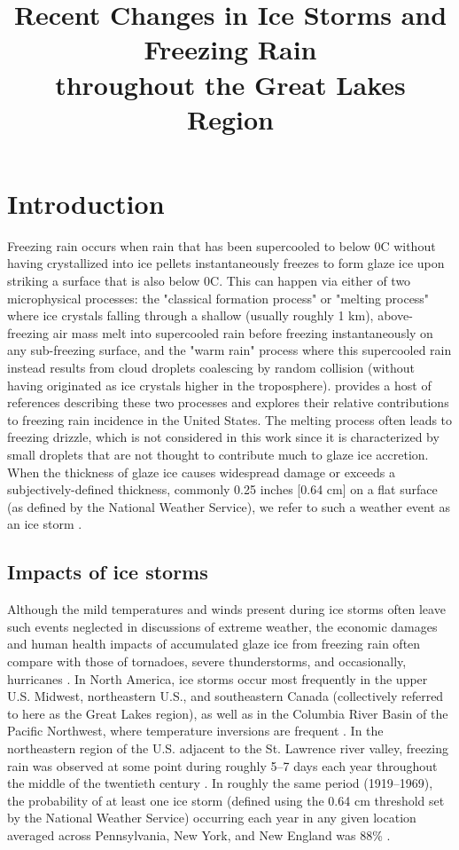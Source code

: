\documentclass[twocol]{ametsoc}
\title{Recent Changes in Ice Storms and Freezing Rain\\ throughout the Great Lakes Region}
\affiliation{ National Renewable Energy Laboratory, Golden, Colorado}
\begin{document}
\maketitle
%
\section{Introduction}
Freezing rain occurs when rain that has been supercooled to below 0\degree C without having crystallized into ice pellets instantaneously freezes to form glaze ice upon striking a surface that is also below 0\degree C. This can happen via either of two microphysical processes: the "classical formation process" or "melting process" where ice crystals falling through a shallow (usually roughly 1 km), above-freezing air mass melt into supercooled rain before freezing instantaneously on any sub-freezing surface, and the "warm rain" process where this supercooled rain instead results from cloud droplets coalescing by random collision (without having originated as ice crystals higher in the troposphere). \citet{rauber2000relative} provides a host of references describing these two processes and explores their relative contributions to freezing rain incidence in the United States. The melting process often leads to freezing drizzle, which is not considered in this work since it is characterized by small droplets that are not thought to contribute much to glaze ice accretion. When the thickness of glaze ice causes widespread damage or exceeds a subjectively-defined thickness, commonly 0.25 inches [0.64 cm] on a flat surface (as defined by the National Weather Service), we refer to such a weather event as an ice storm \citep{nwsglossary}.

\subsection{Impacts of ice storms}
Although the mild temperatures and winds present during ice storms often leave such events neglected in discussions of extreme weather, the economic damages and human health impacts of accumulated glaze ice from freezing rain often compare with those of tornadoes, severe thunderstorms, and occasionally, hurricanes \citep{lott2006tracking}. In North America, ice storms occur most frequently in the upper U.S. Midwest, northeastern U.S., and southeastern Canada (collectively referred to here as the Great Lakes region), as well as in the Columbia River Basin of the Pacific Northwest, where temperature inversions are frequent \citep{changnon2003temporal, bernstein2000regional}. In the northeastern region of the U.S. adjacent to the St. Lawrence river valley, freezing rain was observed at some point during roughly 5--7 days each year throughout the middle of the twentieth century \citep{changnon2003temporal}. In roughly the same period (1919--1969), the probability of at least one ice storm (defined using the 0.64 cm threshold set by the National Weather Service) occurring each year in any given location averaged across Pennsylvania, New York, and New England was 88\% \citep{tattelman1973estimated}. 
\end{document}
